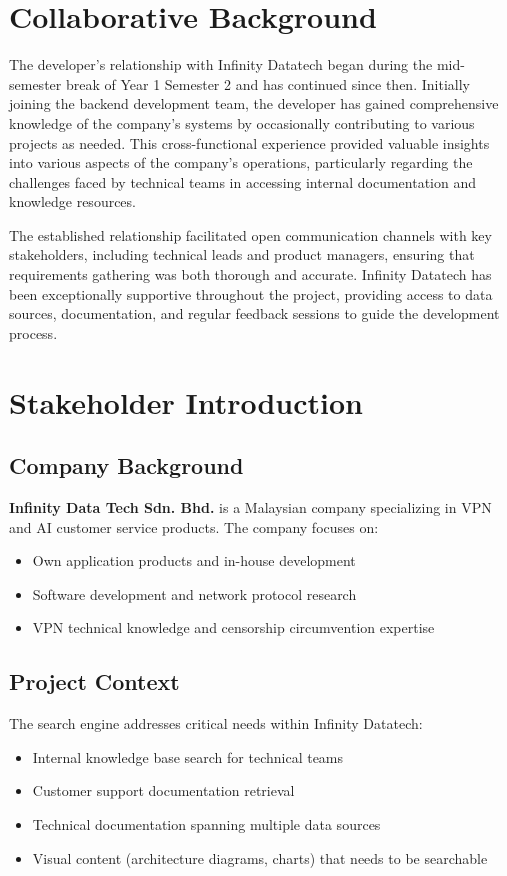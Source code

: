 \documentclass{report}
\begin{document}
\section{Collaborative Background}

The developer's relationship with Infinity Datatech began during the mid-semester break of Year 1 Semester 2 and has continued since then. Initially joining the backend development team, the developer has gained comprehensive knowledge of the company's systems by occasionally contributing to various projects as needed. This cross-functional experience provided valuable insights into various aspects of the company's operations, particularly regarding the challenges faced by technical teams in accessing internal documentation and knowledge resources.

The established relationship facilitated open communication channels with key stakeholders, including technical leads and product managers, ensuring that requirements gathering was both thorough and accurate. Infinity Datatech has been exceptionally supportive throughout the project, providing access to data sources, documentation, and regular feedback sessions to guide the development process.

\section{Stakeholder Introduction}

\subsection{Company Background}
\textbf{Infinity Data Tech Sdn. Bhd.} is a Malaysian company specializing in VPN and AI customer service products. The company focuses on:
\begin{itemize}
    \item Own application products and in-house development
    \item Software development and network protocol research
    \item VPN technical knowledge and censorship circumvention expertise
\end{itemize}

\subsection{Project Context}
The search engine addresses critical needs within Infinity Datatech:
\begin{itemize}
    \item Internal knowledge base search for technical teams
    \item Customer support documentation retrieval
    \item Technical documentation spanning multiple data sources
    \item Visual content (architecture diagrams, charts) that needs to be searchable
\end{itemize}
\end{document}
